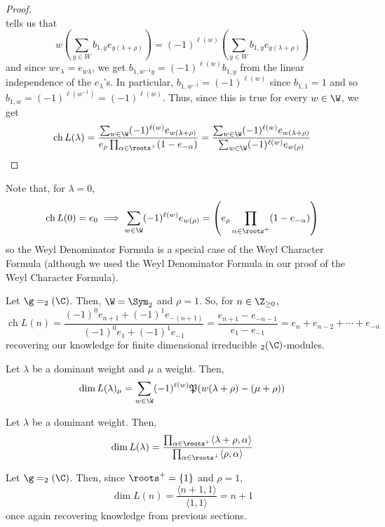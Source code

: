 \documentclass[11pt,leqno,oneside]{amsart}
\numberwithin{thm}{section}
\newcommand{\ch}{\operatorname{ch}}
\newcommand{\halfsum}{\rho}
\newcommand{\numposrootcombos}{\mathfrak{P}}
\begin{document}
\begin{proof}
\[  \]
  tells us that \[
    w\left( \sum_{y \in W} b_{1,y} e_{y(\lambda+\halfsum)} \right) = (-1)^{\ell(w)}\left( \sum_{y \in W} b_{1,y} e_{y(\lambda+\halfsum)} \right)
  \]
  and since \(we_{\lambda} = e_{w\lambda}\), we get \(b_{1,w^{-1}y} =
  (-1)^{\ell(w)} b_{1,y}\) from the linear independence of the
  \(e_\lambda\)'s. In particular, \(b_{1,w^{-1}} = (-1)^{\ell(w)}\) since
  \(b_{1,1} = 1\) and so \(b_{1,w} = (-1)^{\ell(w^{-1})} =
  (-1)^{\ell(w)}\). Thus, since this is true for every \(w \in \W\),
  we get \[
    \ch L(\lambda) = \frac{\sum_{w \in \W} (-1)^{\ell(w)}
      e_{w(\lambda+\halfsum)}}{e_\halfsum \prod_{\alpha \in \roots^+}
      (1-e_{-\alpha})} = \frac{\sum_{w \in \W} (-1)^{\ell(w)}
      e_{w(\lambda+\halfsum)}}{\sum_{w \in \W}
      (-1)^{\ell(w)}e_{w(\halfsum)}} 
  \]
\end{proof}
Note that, for \(\lambda = 0\), \[
  \ch L(0) = e_0 \implies \sum_{w \in \W}(-1)^{\ell(w)}
  e_{w(\halfsum)} = \left(e_\halfsum \prod_{\alpha \in
      \roots^+}(1-e_{-\alpha}) \right) 
\]
so the Weyl Denominator Formula is a special case of the Weyl
Character Formula (although we used the Weyl Denominator Formula in
our proof of the Weyl Character Formula).
\begin{example}
  Let \(\g = \sl_2(\C)\). Then, \(\W = \Sym_2\) and \(\halfsum = 1\). So, for \(n \in \Z_{\geq 0}\), \[
    \ch L(n) = \frac{(-1)^0 e_{n+1} + (-1)^1 e_{-(n+1)}}{(-1)^0 e_1 +
      (-1)^1 e_{-1}} = \frac{e_{n+1}-e_{-n-1}}{e_1-e_{-1}} =
    e_n+e_{n-2}+\cdots+e_{-n} 
  \]
  recovering our knowledge for finite dimensional irreducible
  \(\sl_2(\C)\)-modules.
\end{example}
\begin{thm}
  Let \(\lambda\) be a dominant weight and \(\mu\) a weight. Then, \[
    \dim L(\lambda)_\mu = \sum_{w \in \W} (-1)^{\ell(w)}
    \numposrootcombos(w(\lambda+\halfsum)-(\mu+\halfsum)) 
  \] 
\end{thm}
\begin{thm}
  Let \(\lambda\) be a dominant weight. Then, \[
    \dim L(\lambda) = \frac{\prod_{\alpha \in \roots^+} \langle
      \lambda+\halfsum, \alpha \rangle}{\prod_{\alpha \in \roots^+}
      \langle \halfsum, \alpha \rangle}
  \]
\end{thm}
\begin{example}
  Let \(\g = \sl_2(\C)\). Then, since \(\roots^+
  = \{1\}\) and \(\halfsum = 1\), \[
    \dim L(n) = \frac{\langle n+1,1 \rangle}{\langle 1,1 \rangle} = n+1
  \]
  once again recovering knowledge from previous sections. 
\end{example}
\end{document}
